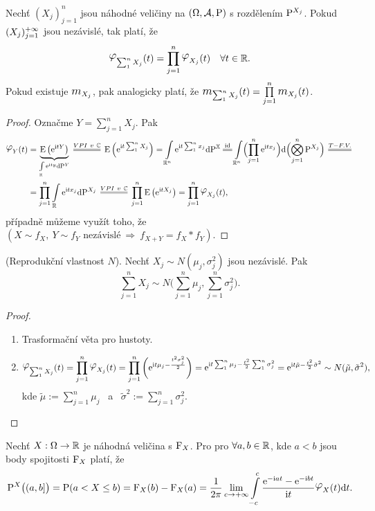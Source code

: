 \begin{theorem}
	Nechť $(X_j)_{j=1}^n$ jsou náhodné veličiny na $(\Omega,\mathcal{A},\mathrm{P})$ s rozdělením $\mathrm{P}^{X_j}$. Pokud $(X_j)_{j=1}^{+\infty}$ jsou nezávislé, tak platí, že 
	$$ \lphi_{\sum_{1}^{n}X_j}(t)=\prod\limits_{j=1}^n \lphi_{X_j}(t)~~~\forall t\in\R. $$ 
	Pokud existuje $\m_{X_j}$, pak analogicky platí, že $\m_{\sum_{1}^{n}X_j}(t)=\prod\limits_{j=1}^{n}\m_{X_j}(t)$.
	\begin{proof} Označme $Y=\sum\limits_{j=1}^{n}X_j$. Pak
		\[
		\begin{split}
		\lphi_Y(t)&=\underbrace{\E \left( \me^{\mi tY} \right)}_{\int\limits_{\R}\me^{\mi ty}\dif \PP^Y}\equal{VPI~v~\C}\E \left( \me^{\mi t\sum_{1}^{n} X_j} \right)=\int\limits_{\R^n}\me^{\mi t\sum_{1}^nx_j}\dif\PEX \equal{\text{id}}\int\limits_{\R^n}\Bigl( \prod\limits_{j=1}^n \me^{\mi tx_j} \Bigr)\dif\Bigl( \bigotimes\limits_{j=1}^n \PP^{X_j} \Bigr)\equal{T-F.V.} \\
		&=\prod\limits_{j=1}^n\int\limits_{\R}\me^{\mi tx_j}\dif \PP^{X_j}\equal{VPI~v~\C}\prod\limits_{j=1}^n \E \left( \me^{\mi tX_j} \right)=\prod\limits_{j=1}^n \lphi_{X_j}(t),
		\end{split}
		\] 
		případně můžeme využít toho, že ~ $ \left( X\sim f_X,~Y\sim f_Y \text{ nezávislé}~\Rightarrow~ f_{X+Y}=f_X\ast f_Y \right) $.
	\end{proof}
\end{theorem}
\begin{example}
	(Reprodukční vlastnost $N$). 
	Nechť $X_j\sim N(\mu_j,\sigma_j^2)$ jsou nezávislé. Pak 
	$$ \sum\limits_{j=1}^n X_j\sim N\biggl( \sum\limits_{j=1}^n \mu_j,\sum\limits_{j=1}^n \sigma_j^2 \biggr). $$
	\begin{proof}
		\begin{enumerate}
			\item Trasformační věta pro hustoty.
			\item $$ \lphi_{\sum_{1}^{n}X_j}(t)=\prod\limits_{j=1}^n \lphi_{X_j}(t)=\prod\limits_{j=1}^n \left( \me^{\mi t \mu_j-\frac{t^2\sigma_j^2}{2}} \right)=\me^{\mi t\sum_{1}^n\mu_j-\frac{t^2}{2}\sum_{1}^n \sigma_j^2}=\me^{\mi t\tilde{\mu}-\frac{t^2}{2}\tilde{\sigma}^2}\sim N(\tilde{\mu},\tilde{\sigma}^2), $$
			kde $\tilde{\mu}:=\sum\limits_{j=1}^n \mu_j $~ a ~$\tilde{\sigma}^2:=\sum\limits_{j=1}^n \sigma_j^2$.
		\end{enumerate}
	\end{proof}
\end{example}
\begin{theorem}
	Nechť $X:\Omega\to\mathbb{R}$ je náhodná veličina s $\mathrm{F}_X$. Pro pro $\forall a,b\in\mathbb{R}$, kde $a<b$ jsou body spojitosti $\mathrm{F}_X$ platí, že 
	\[
	\PP^X\bigl((a,b]\bigr)=\PP(a<X\leq b)=\FF_X(b)-\FF_X(a)=\frac{1}{2\pi}\lim\limits_{ c\to +\infty}\int\limits_{-c}^c\frac{\me^{-\mi at}-\me^{-\mi bt}}{\mi t}\lphi_X(t)\dif t.
	\]
\end{theorem}
